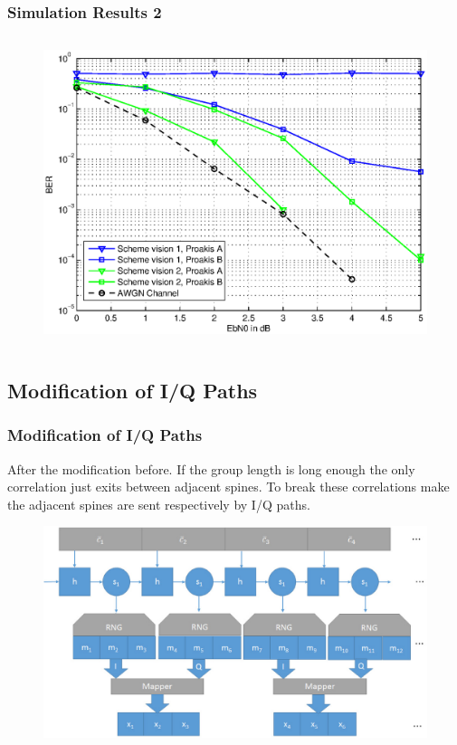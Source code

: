 \documentclass{beamer}
\begin{document}
\begin{frame}

\frametitle{Simulation Results 2}

\begin{columns}[c]
\begin{figure}
\includegraphics[width=.99\textwidth]{figure_vision2.eps}
\end{figure}

\end{columns}

\end{frame}


\subsection{Modification of I/Q Paths}
\begin{frame}
\frametitle{Modification of I/Q Paths}
After the modification before. If the group length is long enough the only correlation just exits between adjacent spines. To break these correlations make the adjacent spines are sent respectively by I/Q paths.
\begin{figure}
\includegraphics[width=0.8\linewidth]{diagram_v3.eps}
\end{figure}
\end{frame}
\end{document}
